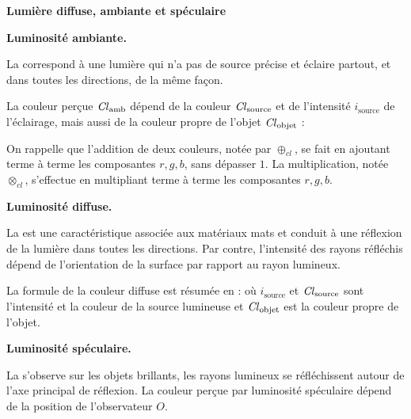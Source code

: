 \documentclass[11pt,class=report,crop=false]{standalone}
\begin{document}
\begin{center}
\begin{minipage}{0.49\textwidth}
		{\bf \quad Lumière diffuse, ambiante et spéculaire}
	\end{minipage}
	
\end{center}


\textbf{Luminosité ambiante.}

La  correspond à une lumière qui n'a pas de source précise et éclaire partout, et dans toutes les directions, de la même façon.


La couleur perçue $\operatorname{\it Cl}_{\text{amb}}$ dépend de la couleur $\operatorname{\it Cl}_{\text{source}}$ et de l'intensité $i_{\text{source}}$ de l'éclairage, mais aussi de la couleur propre de l'objet $\operatorname{\it Cl}_{\text{objet}}$ :


On rappelle que l'addition de deux couleurs, notée par $\oplus_{cl}$, se fait en ajoutant terme à terme les composantes $r,g,b$, sans dépasser $1$.
La multiplication, notée $\otimes_{cl}$, s'effectue en  multipliant terme à terme les composantes $r,g,b$.
  
\medskip
  
\textbf{Luminosité diffuse.}

La  est une caractéristique associée aux matériaux mats et conduit à une réflexion de la lumière dans toutes les directions. Par contre, l'intensité des rayons réfléchis dépend de l'orientation de la surface par rapport au rayon lumineux.


La formule de la couleur diffuse est résumée en :
où $i_{\text{source}}$ et $\operatorname{\it Cl}_{\text{source}}$ sont l'intensité et la couleur de la source lumineuse et $\operatorname{\it Cl}_{\text{objet}}$ est la couleur propre de l'objet.

\medskip

\textbf{Luminosité spéculaire.}

La  s'observe sur les objets brillants, les rayons lumineux se réfléchissent autour de l'axe principal de réflexion. La couleur perçue par luminosité spéculaire dépend de la position de l'observateur $O$.


\end{document}
